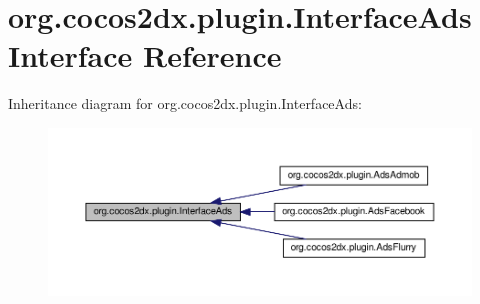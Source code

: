 \hypertarget{interfaceorg_1_1cocos2dx_1_1plugin_1_1InterfaceAds}{}\section{org.\+cocos2dx.\+plugin.\+Interface\+Ads Interface Reference}
\label{interfaceorg_1_1cocos2dx_1_1plugin_1_1InterfaceAds}


Inheritance diagram for org.\+cocos2dx.\+plugin.\+Interface\+Ads\+:
\nopagebreak
\begin{figure}[H]
\begin{center}
\leavevmode
\includegraphics[width=350pt]{interfaceorg_1_1cocos2dx_1_1plugin_1_1InterfaceAds__inherit__graph}
\end{center}
\end{figure}
